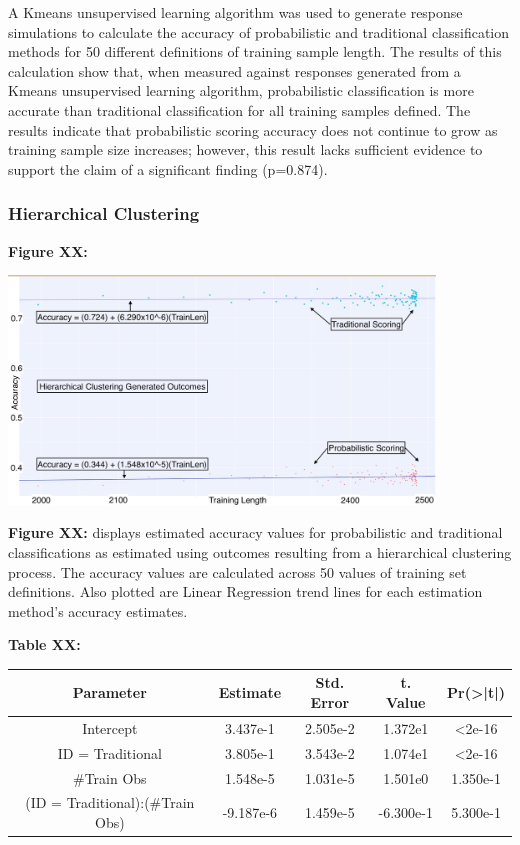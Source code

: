 \documentclass[12pt,]{article}
\begin{document}
A Kmeans unsupervised learning algorithm was used to generate response
simulations to calculate the accuracy of probabilistic and traditional
classification methods for 50 different definitions of training sample
length. The results of this calculation show that, when measured against
responses generated from a Kmeans unsupervised learning algorithm,
probabilistic classification is more accurate than traditional
classification for all training samples defined. The results indicate
that probabilistic scoring accuracy does not continue to grow as
training sample size increases; however, this result lacks sufficient
evidence to support the claim of a significant finding (p=0.874).

\hypertarget{hierarchical-clustering-1}{%
\subsubsection{Hierarchical
Clustering}\label{hierarchical-clustering-1}}

\textbf{Figure XX:}

\begin{center}
\includegraphics[width=0.85\textwidth]{HCResultsGraph.jpeg}
\end{center}

\textbf{Figure XX:} displays estimated accuracy values for probabilistic
and traditional classifications as estimated using outcomes resulting
from a hierarchical clustering process. The accuracy values are
calculated across 50 values of training set definitions. Also plotted
are Linear Regression trend lines for each estimation method's accuracy
estimates.

\textbf{Table XX:}

\begin{center}
\begin{tabular}{|c|c|c|c|c|}
\hline
Parameter                      & Estimate  & Std. Error & t. Value  & Pr(>|t|) \\
\hline
\hline
Intercept                      &  3.437e-1 &  2.505e-2  &  1.372e1  & <2e-16   \\
\hline
ID = Traditional               & 3.805e-1 &  3.543e-2  & 1.074e1  & <2e-16 \\
\hline
\#Train Obs                    &  1.548e-5 &  1.031e-5  &  1.501e0  & 1.350e-1 \\
\hline
(ID = Traditional):(\#Train Obs) &  -9.187e-6 &  1.459e-5  &  -6.300e-1 & 5.300e-1 \\
\hline
\end{tabular}
\end{center}
\end{document}
